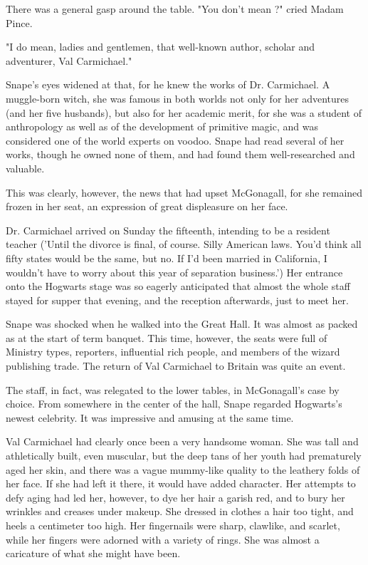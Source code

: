 There was a general gasp around the table. "You don't mean{\el} ?" cried Madam Pince.

"I do mean, ladies and gentlemen, that well-known author, scholar and adventurer, Val Carmichael."

Snape's eyes widened at that, for he knew the works of Dr. Carmichael. A muggle-born witch, she was famous in both worlds not only for her adventures (and her five husbands), but also for her academic merit, for she was a student of anthropology as well as of the development of primitive magic, and was considered one of the world experts on voodoo. Snape had read several of her works, though he owned none of them, and had found them well-researched and valuable.

This was clearly, however, the news that had upset McGonagall, for she remained frozen in her seat, an expression of great displeasure on her face.

Dr. Carmichael arrived on Sunday the fifteenth, intending to be a resident teacher ('Until the divorce is final, of course. Silly American laws. You'd think all fifty states would be the same, but no. If I'd been married in California, I wouldn't have to worry about this year of separation business.') Her entrance onto the Hogwarts stage was so eagerly anticipated that almost the whole staff stayed for supper that evening, and the reception afterwards, just to meet her.

Snape was shocked when he walked into the Great Hall. It was almost as packed as at the start of term banquet. This time, however, the seats were full of Ministry types, reporters, influential rich people, and members of the wizard publishing trade. The return of Val Carmichael to Britain was quite an event.

The staff, in fact, was relegated to the lower tables, in McGonagall's case by choice. From somewhere in the center of the hall, Snape regarded Hogwarts's newest celebrity. It was impressive and amusing at the same time.

Val Carmichael had clearly once been a very handsome woman. She was tall and athletically built, even muscular, but the deep tans of her youth had prematurely aged her skin, and there was a vague mummy-like quality to the leathery folds of her face. If she had left it there, it would have added character. Her attempts to defy aging had led her, however, to dye her hair a garish red, and to bury her wrinkles and creases under makeup. She dressed in clothes a hair too tight, and heels a centimeter too high. Her fingernails were sharp, clawlike, and scarlet, while her fingers were adorned with a variety of rings. She was almost a caricature of what she might have been.

